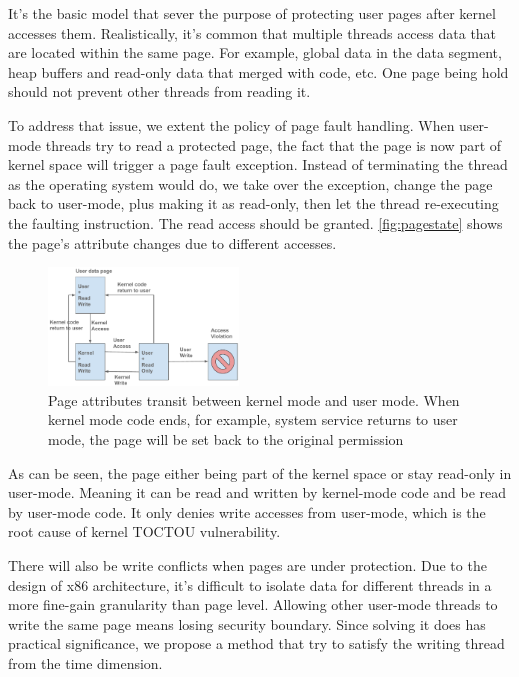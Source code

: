 It's the basic model that sever the purpose of protecting user pages after kernel accesses them. Realistically, it's common that multiple threads access data that are located within the same page. For example, global data in the data segment, heap buffers and read-only data that merged with code, etc. One page being hold should not prevent other threads from reading it.


To address that issue, we extent the policy of page fault handling. When user-mode threads try to read a protected page, the fact that the page is now part of kernel space will trigger a page fault exception. Instead of terminating  the thread as the operating system would do, we take over the exception, change the page back to user-mode, plus making it as read-only, then let the thread re-executing the faulting instruction. The read access should be granted. \autoref{fig:pagestate} shows the page's attribute changes due to different accesses.
 

\begin{figure}[th]
  \includegraphics[width=0.45\textwidth]{figures/pagestate}
  \centering
  \caption{Page attributes transit between kernel mode and user mode. When kernel mode code ends, for example, system service returns to user mode, the page will be set back to the original permission}
  \label{fig:pagestate}
\end{figure}

As can be seen, the page either being part of the kernel space or stay read-only in user-mode. Meaning it can be read and written by kernel-mode code and be read by user-mode code. It only denies write accesses from user-mode, which is the root cause of kernel TOCTOU vulnerability.


There will also be write conflicts when pages are under protection. Due to the design of x86 architecture, it's difficult to isolate data for different threads in a more fine-gain granularity than page level. Allowing other user-mode threads to write the same page means losing security boundary. Since solving it does has practical significance, we propose a method that try to satisfy the writing thread from the time dimension.


